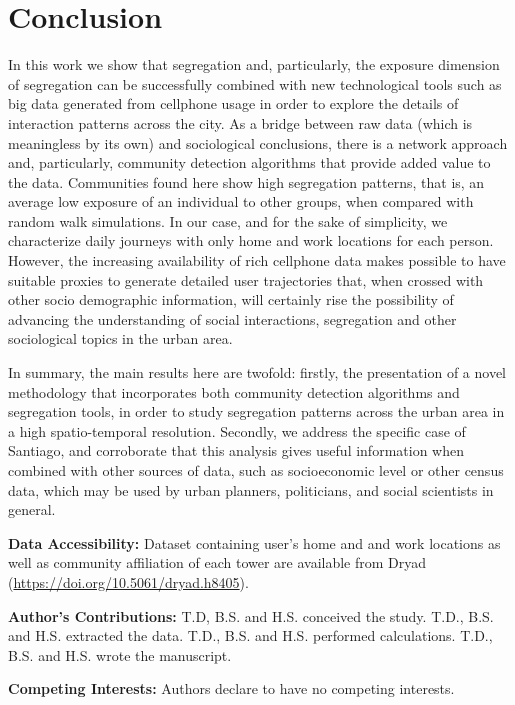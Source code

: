 \documentclass[%
preprint,
 amsmath,amssymb,
pra,
]{revtex4-1}
\begin{document}
\section{Conclusion}
In this work we show that segregation and, particularly, the exposure dimension of segregation can be successfully combined with new technological tools such as big data generated from cellphone usage in order to explore the details of interaction patterns across the city. As a bridge between raw data (which is meaningless by its own) and sociological conclusions, there is a network approach and, particularly, community detection algorithms that provide added value to the data. Communities found here show high segregation patterns, that is, an average low exposure of an individual to other groups, when compared with random walk simulations. In our case, and for the sake of simplicity, we characterize daily journeys with only home and work locations for each person. However, the  increasing availability of rich cellphone data makes possible to have suitable proxies to generate detailed user trajectories that, when crossed with other socio demographic information, will certainly rise the possibility of advancing the understanding of  social interactions, segregation and other sociological topics in the urban area. 

In summary, the main results here are twofold: firstly, the presentation of a novel methodology that incorporates both community detection algorithms and segregation tools, in order to study segregation patterns across the urban area in a high spatio-temporal resolution. Secondly, we address the specific case of Santiago, and corroborate that this analysis gives useful information when combined with other sources of data, such as socioeconomic level or other census data, which may be used by urban planners, politicians, and social scientists in general. 

\bigskip
\noindent
\textbf{Data Accessibility:} Dataset containing user's home and and work locations as well as community affiliation of each tower are available from Dryad (\url{https://doi.org/10.5061/dryad.h8405}).

\bigskip
\noindent
\textbf{Author's Contributions:} T.D, B.S. and H.S. conceived the study. T.D., B.S. and H.S. extracted the data. T.D., B.S. and H.S. performed calculations. T.D., B.S. and H.S. wrote the manuscript.

\bigskip
\noindent
\textbf{Competing Interests:} Authors declare to have no competing interests.
\end{document}
